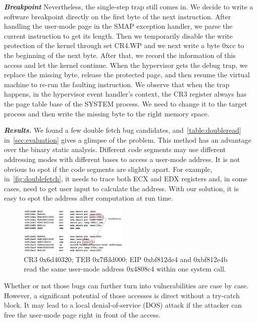 \textbf{\textit{Breakpoint}} Nevertheless, the single-step trap still comes in. We decide to write a software breakpoint directly on the first byte of the next instruction. After handling the user-mode page in the SMAP exception handler, we parse the current instruction to get its length. Then we temporarily disable the write protection of the kernel through set CR4.WP and we next write a byte 0xcc to the beginning of the next byte. After that, we record the information of this access and let the kernel continue. When the hypervisor gets the debug trap, we replace the missing byte, release the protected page, and then resume the virtual machine to re-run the faulting instruction. We observe that when the trap happens, in the hypervisor event handler's context, the CR3 register always has the page table base of the SYSTEM process. We need to change it to the target process and then write the missing byte to the right memory space.

\textbf{\textit{Results.}} 
We found a few double fetch bug candidates, and~\autoref{table:doubleread} in~\autoref{sec:evaluation} gives a glimpse of the problem. This method has an advantage over the binary static analysis. Different code segments may use different addressing modes with different bases to access a user-mode address.  It is not obvious to spot if the code segments are slightly apart. For example, in~\autoref{fig:doublefetch}, it needs to trace both ECX and EDX registers and, in some cases, need to get user input to calculate the address. With our solution, it is easy to spot the address after computation at run time.

\begin{figure}[th]
  \includegraphics[width=0.47\textwidth]{figures/doublefetch}
  \centering
  \caption{CR3 0x6d40320; TEB 0x7ffdd000; EIP 0xbf812de4 and 0xbf812e4b read the same user-mode address 0x4808c4 within one system call.}
  \label{fig:doublefetch}
\end{figure}


Whether or not those bugs can further turn into vulnerabilities are case by case. However, a significant potential of those accesses is direct without a try-catch block. It may lead to a local denial-of-service (DOS) attack if the attacker can free the user-mode page right in front of the access. 
